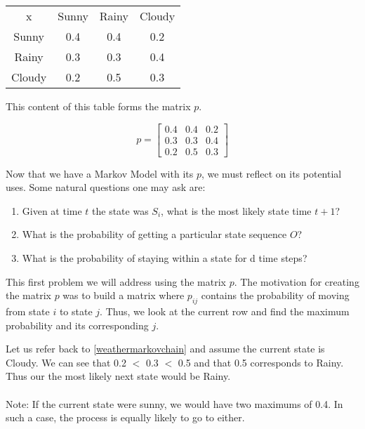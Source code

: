 \begin{center}
    \begin{tabular}{c c c c}
        x      & Sunny & Rainy & Cloudy \\
        Sunny  & 0.4   & 0.4   & 0.2 \\
        Rainy  & 0.3   & 0.3   & 0.4 \\ 
        Cloudy & 0.2   & 0.5   & 0.3 
    \end{tabular}
\end{center}

This content of this table forms the matrix $p$. 

\begin{equation}
p = 
\begin{bmatrix}
    0.4 & 0.4 & 0.2 \\
    0.3 & 0.3 & 0.4 \\
    0.2 & 0.5 & 0.3 
    \end{bmatrix}
\end{equation}

Now that we have a Markov Model with its $p$, we must reflect on its potential uses. Some natural questions one may ask are:
\begin{enumerate}
    \item Given at time $t$ the state was $S_i$, what is the most likely state time $t+1$?
    \item What is the probability of getting a particular state sequence $O$?
    \item What is the probability of staying within a state for d time steps?
\end{enumerate}

This first problem we will address using the matrix $p$. The motivation for creating the matrix $p$ was to build a matrix where $p_{ij}$ contains the probability of moving from state $i$ to state $j$. Thus, we look at the current row and find the maximum probability and its corresponding $j$.
\begin{example}
    Let us refer back to \ref{weathermarkovchain} and assume the current state is Cloudy. We can see that 0.2 $<$ 0.3 $<$ 0.5 and that 0.5 corresponds to Rainy. Thus our the most likely next state would be Rainy. 
    \\
    \\
    Note: If the current state were sunny, we would have two maximums of 0.4. In such a case, the process is equally likely to go to either. 
\end{example}

